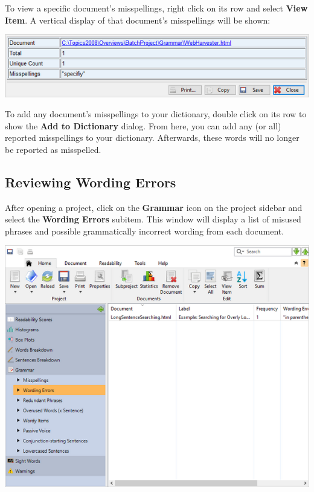 \documentclass[
]{book}
\theoremstyle{definition}
\theoremstyle{definition}
\theoremstyle{definition}
\theoremstyle{definition}
\theoremstyle{remark}
\begin{document}
To view a specific document's misspellings, right click on its row and select \textbf{View Item}. A vertical display of that document's misspellings will be shown:

\includegraphics{Images/batchmisspellingsviewitem.png}

To add any document's misspellings to your dictionary, double click on its row to show the \textbf{Add to Dictionary} dialog. From here, you can add any (or all) reported misspellings to your dictionary. Afterwards, these words will no longer be reported as misspelled.

\hypertarget{reviewing-batch-wording-errors}{%
\subsection*{Reviewing Wording Errors}\label{reviewing-batch-wording-errors}}

After opening a project, click on the \textbf{Grammar} icon on the project sidebar and select the \textbf{Wording Errors} subitem. This window will display a list of misused phrases and possible grammatically incorrect wording from each document.

\includegraphics{Images/batchwordingerrors.png}
\end{document}
